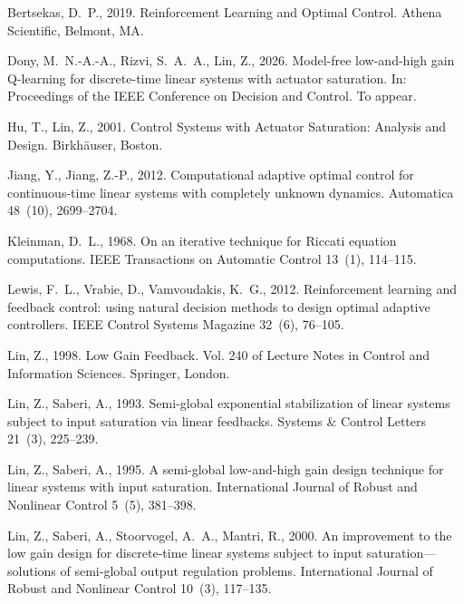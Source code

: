 \documentclass[final,5p,times,authoryear]{elsarticle}
\theoremstyle{plain}
\theoremstyle{definition}
\theoremstyle{remark}
\begin{document}
\begingroup\small
\begin{thebibliography}{}

Bertsekas, D.~P., 2019. Reinforcement Learning and Optimal Control.
Athena Scientific, Belmont, MA.

Dony, M.~N.-A.-A., Rizvi, S.~A.~A., Lin, Z., 2026. Model-free
low-and-high gain Q-learning for discrete-time linear systems with
actuator saturation. In: Proceedings of the IEEE Conference on
Decision and Control. To appear.

Hu, T., Lin, Z., 2001. Control Systems with Actuator Saturation:
Analysis and Design. Birkh\"{a}user, Boston.

Jiang, Y., Jiang, Z.-P., 2012. Computational adaptive optimal control
for continuous-time linear systems with completely unknown dynamics.
Automatica 48~(10), 2699--2704.

Kleinman, D.~L., 1968. On an iterative technique for Riccati equation
computations. IEEE Transactions on Automatic Control 13~(1), 114--115.

Lewis, F.~L., Vrabie, D., Vamvoudakis, K.~G., 2012. Reinforcement
learning and feedback control: using natural decision methods to design
optimal adaptive controllers. IEEE Control Systems Magazine 32~(6),
76--105.

Lin, Z., 1998. Low Gain Feedback. Vol. 240 of Lecture Notes in Control
and Information Sciences. Springer, London.

Lin, Z., Saberi, A., 1993. Semi-global exponential stabilization of
linear systems subject to input saturation via linear feedbacks.
Systems \& Control Letters 21~(3), 225--239.

Lin, Z., Saberi, A., 1995. A semi-global low-and-high gain design
technique for linear systems with input saturation. International
Journal of Robust and Nonlinear Control 5~(5), 381--398.

Lin, Z., Saberi, A., Stoorvogel, A.~A., Mantri, R., 2000. An
improvement to the low gain design for discrete-time linear systems
subject to input saturation---solutions of semi-global output
regulation problems. International Journal of Robust and Nonlinear
Control 10~(3), 117--135.


\end{thebibliography}
\end{document}

